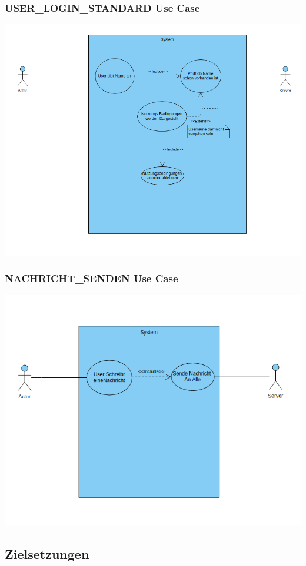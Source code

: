 \documentclass[12pt]{article}
\begin{document}
      \subsubsection{USER\_LOGIN\_STANDARD Use Case}
        \includegraphics[width=\textwidth]{useCase_USER_LOGIN_STANDARD.png}
      \subsubsection{NACHRICHT\_SENDEN Use Case}
        \includegraphics[width=\textwidth]{useCase_NACHRICHT_SENDEN.png}

    \subsection{Zielsetzungen}
\end{document}
